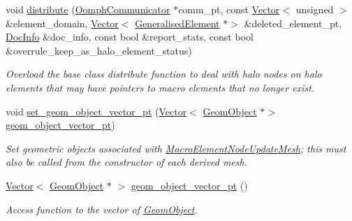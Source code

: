 \begin{DoxyCompactItemize}
void \hyperlink{classoomph_1_1MacroElementNodeUpdateMesh_ab3712092128e5f47dc664603b0b1776f}{distribute} (\hyperlink{classoomph_1_1OomphCommunicator}{Oomph\+Communicator} $\ast$comm\+\_\+pt, const \hyperlink{classoomph_1_1Vector}{Vector}$<$ unsigned $>$ \&element\+\_\+domain, \hyperlink{classoomph_1_1Vector}{Vector}$<$ \hyperlink{classoomph_1_1GeneralisedElement}{Generalised\+Element} $\ast$$>$ \&deleted\+\_\+element\+\_\+pt, \hyperlink{classoomph_1_1DocInfo}{Doc\+Info} \&doc\+\_\+info, const bool \&report\+\_\+stats, const bool \&overrule\+\_\+keep\+\_\+as\+\_\+halo\+\_\+element\+\_\+status)
\begin{DoxyCompactList}\small\item\em Overload the base class distribute function to deal with halo nodes on halo elements that may have pointers to macro elements that no longer exist. \end{DoxyCompactList}\item 
void \hyperlink{classoomph_1_1MacroElementNodeUpdateMesh_a4e9169d4a31189eb8e224e21f5f47383}{set\+\_\+geom\+\_\+object\+\_\+vector\+\_\+pt} (\hyperlink{classoomph_1_1Vector}{Vector}$<$ \hyperlink{classoomph_1_1GeomObject}{Geom\+Object} $\ast$$>$ \hyperlink{classoomph_1_1MacroElementNodeUpdateMesh_ac533cc3ab7ae1d1c03cefba50ad5acff}{geom\+\_\+object\+\_\+vector\+\_\+pt})
\begin{DoxyCompactList}\small\item\em Set geometric objects associated with \hyperlink{classoomph_1_1MacroElementNodeUpdateMesh}{Macro\+Element\+Node\+Update\+Mesh}; this must also be called from the constructor of each derived mesh. \end{DoxyCompactList}\item 
\hyperlink{classoomph_1_1Vector}{Vector}$<$ \hyperlink{classoomph_1_1GeomObject}{Geom\+Object} $\ast$ $>$ \hyperlink{classoomph_1_1MacroElementNodeUpdateMesh_ac533cc3ab7ae1d1c03cefba50ad5acff}{geom\+\_\+object\+\_\+vector\+\_\+pt} ()
\begin{DoxyCompactList}\small\item\em Access function to the vector of \hyperlink{classoomph_1_1GeomObject}{Geom\+Object}. \end{DoxyCompactList}\end{DoxyCompactItemize}
